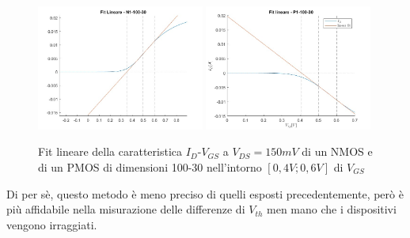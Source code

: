 \documentclass[12pt, letterpaper]{book}
\begin{document}
\begin{figure}[h!]
\centering
 \includegraphics[width=0.49\textwidth]{LinearFit-N1-100-30}
 \includegraphics[width=0.49\textwidth]{LinearFit-P1-100-30}
 \caption{Fit lineare della caratteristica  $I_D$-$V_{GS}$ a $V_{DS}=150mV$ di un NMOS e di un PMOS di dimensioni 100-30 nell'intorno $[0,4V ; 0,6V]$ di $V_{GS}$}
\end{figure}

Di per sè, questo metodo è meno preciso di quelli esposti precedentemente, però è più affidabile nella misurazione delle differenze di $V_{th}$ men mano che i dispositivi vengono irraggiati.
\end{document}
